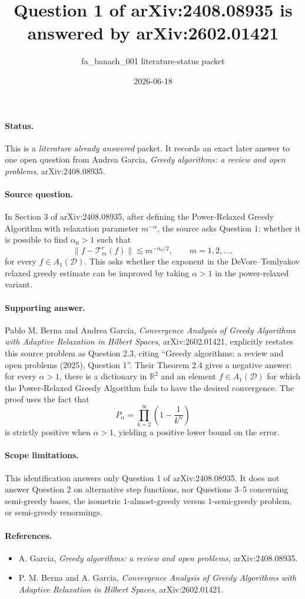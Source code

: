 \documentclass[11pt]{article}
\title{Question 1 of arXiv:2408.08935 is answered by arXiv:2602.01421}
\author{fa\_banach\_001 literature-status packet}
\date{2026-06-18}
\begin{document}
\maketitle

\paragraph{Status.}
This is a \emph{literature already answered} packet.  It records an exact
later answer to one open question from Andrea Garcia, \emph{Greedy algorithms:
a review and open problems}, arXiv:2408.08935.

\paragraph{Source question.}
In Section 3 of arXiv:2408.08935, after defining the Power-Relaxed Greedy
Algorithm with relaxation parameter \(m^{-\alpha}\), the source asks Question
1: whether it is possible to find \(\alpha_0>1\) such that
\[
  \|f-\mathcal T_m^r(f)\| \lesssim m^{-\alpha_0/2},\qquad m=1,2,\ldots,
\]
for every \(f\in A_1(\mathcal D)\).  This asks whether the exponent in the
DeVore--Temlyakov relaxed greedy estimate can be improved by taking
\(\alpha>1\) in the power-relaxed variant.

\paragraph{Supporting answer.}
Pablo M. Berna and Andrea Garcia, \emph{Convergence Analysis of Greedy
Algorithms with Adaptive Relaxation in Hilbert Spaces}, arXiv:2602.01421,
explicitly restates this source problem as Question 2.3, citing
``Greedy algorithms: a review and open problems (2025), Question 1''.  Their
Theorem 2.4 gives a negative answer: for every \(\alpha>1\), there is a
dictionary in \(\mathbb R^2\) and an element \(f\in A_1(\mathcal D)\) for which
the Power-Relaxed Greedy Algorithm fails to have the desired convergence.  The
proof uses the fact that
\[
  P_\alpha=\prod_{k=2}^{\infty}\left(1-\frac1{k^\alpha}\right)
\]
is strictly positive when \(\alpha>1\), yielding a positive lower bound on the
error.

\paragraph{Scope limitations.}
This identification answers only Question 1 of arXiv:2408.08935.  It does not
answer Question 2 on alternative step functions, nor Questions 3--5 concerning
semi-greedy bases, the isometric \(1\)-almost-greedy versus \(1\)-semi-greedy
problem, or semi-greedy renormings.

\paragraph{References.}
\begin{itemize}
\item A. Garcia, \emph{Greedy algorithms: a review and open problems},
  arXiv:2408.08935.
\item P. M. Berna and A. Garcia, \emph{Convergence Analysis of Greedy
  Algorithms with Adaptive Relaxation in Hilbert Spaces}, arXiv:2602.01421.
\end{itemize}
\end{document}

